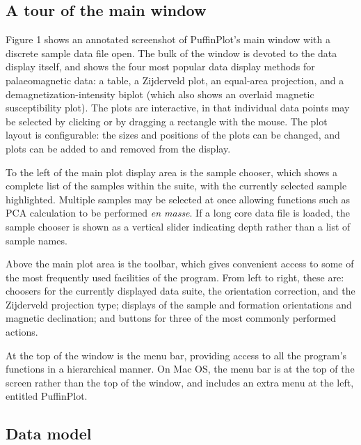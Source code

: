 \documentclass[a4paper,british]{article}
\newcommand{\caps}[1]{\MakeTextUppercase{#1}} %
\begin{document}
\subsection{A tour of the main window}

Figure 1 shows an annotated screenshot of PuffinPlot's main window with
a discrete sample data file open. The bulk of the window is devoted to
the data display itself, and shows the four most popular data display
methods for palaeomagnetic data: a table, a Zijderveld plot, an
equal-area projection, and a demagnetization-intensity biplot (which
also shows an overlaid magnetic susceptibility plot). The plots are
interactive, in that individual data points may be selected by clicking
or by dragging a rectangle with the mouse. The plot layout is configurable:
the sizes and positions of the plots can be changed, and plots can be 
added to and removed from the display.

To the left of the main plot display area is the sample chooser, which shows
a complete list of the samples within the suite, with the currently selected
sample highlighted. Multiple samples may be selected at once allowing
functions such as \caps{pca} calculation to be performed \emph{en masse}. If
a long core data file is loaded, the sample chooser is shown as a vertical
slider indicating depth rather than a list of sample names.

Above the main plot area is the toolbar, which gives convenient access
to some of the most frequently used facilities of the program. From left
to right, these are: choosers for the currently displayed data suite,
the orientation correction, and the Zijderveld projection type; displays
of the sample and formation orientations and magnetic declination; and
buttons for three of the most commonly performed actions.

At the top of the window is the menu bar, providing access to all the
program's functions in a hierarchical manner. On Mac OS, the menu bar is
at the top of the screen rather than the top of the window, and includes
an extra menu at the left, entitled \textsf{PuffinPlot}.

\subsection{Data model}
\end{document}
